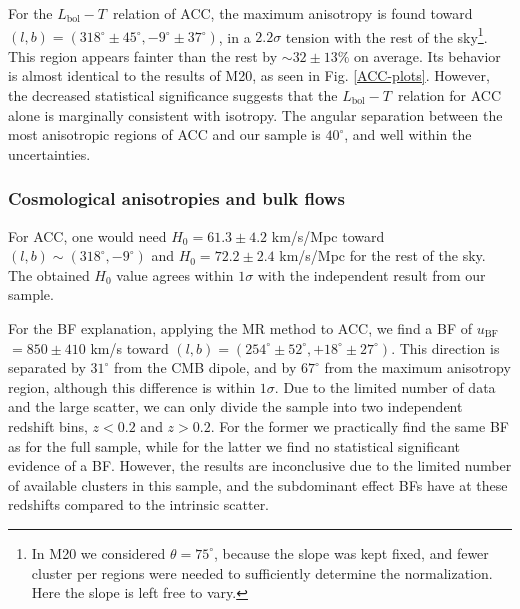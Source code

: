 \documentclass{aa}   %
\newcommand{\ubf}{$u_{\text{BF}}$}
\newcommand{\LbolT}{$L_{\text{bol}}-T$}
\begin{document}
For the \LbolT\ relation of ACC, the maximum anisotropy is found toward $(l,b)=(318^{\circ}\pm 45^{\circ},-9^{\circ}\pm 37^{\circ})$, in a $2.2\sigma$ tension with the rest of the sky\footnote{In M20 we considered $\theta=75^{\circ}$, because the slope was kept fixed, and fewer cluster per regions were needed to sufficiently determine the normalization. Here the slope is left free to vary.}. This region appears fainter than the rest by $\sim 32\pm 13\% $ on average. Its behavior is almost identical to the results of M20, as seen in Fig. \ref{ACC-plots}. However, the decreased statistical significance suggests that the \LbolT\ relation for ACC alone is marginally consistent with isotropy. The angular separation between the most anisotropic regions of ACC and our sample is $40^{\circ}$, and well within the uncertainties.

\subsubsection{Cosmological anisotropies and bulk flows}

For ACC, one would need $H_0=61.3\pm 4.2 $ km/s/Mpc toward $(l,b)\sim (318^{\circ},-9^{\circ})$ and $H_0=72.2\pm 2.4 $ km/s/Mpc for the rest of the sky. The obtained $H_0$ value agrees within $1\sigma$ with the independent result from our sample.


For the BF explanation, applying the MR method to ACC, we find a BF of \ubf$=850\pm 410$ km/s toward $(l,b)=(254^{\circ}\pm 52^{\circ},+18^{\circ}\pm 27^{\circ})$. This direction is separated by $31^{\circ}$ from the CMB dipole, and by $67^{\circ}$ from the maximum anisotropy region, although this difference is within $1\sigma$. Due to the limited number of data and the large scatter, we can only divide the sample into two independent redshift bins, $z<0.2$ and $z>0.2$. For the former we practically find the same BF as for the full sample, while for the latter we find no statistical significant evidence of a BF. However, the results are inconclusive due to the limited number of available clusters in this sample, and the subdominant effect BFs have at these redshifts compared to the intrinsic scatter.
\end{document}
